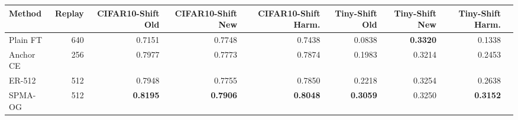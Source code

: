 \begin{tabular}{lrrrrrrrr}
\toprule
Method & Replay & CIFAR10-Shift Old & CIFAR10-Shift New & CIFAR10-Shift Harm. & Tiny-Shift Old & Tiny-Shift New & Tiny-Shift Harm.\\
\midrule
Plain FT & 640 & 0.7151 & 0.7748 & 0.7438 & 0.0838 & \textbf{0.3320} & 0.1338\\
Anchor CE & 256 & 0.7977 & 0.7773 & 0.7874 & 0.1983 & 0.3214 & 0.2453\\
ER-512 & 512 & 0.7948 & 0.7755 & 0.7850 & 0.2218 & 0.3254 & 0.2638\\
SPMA-OG & 512 & \textbf{0.8195} & \textbf{0.7906} & \textbf{0.8048} & \textbf{0.3059} & 0.3250 & \textbf{0.3152}\\
\bottomrule
\end{tabular}
